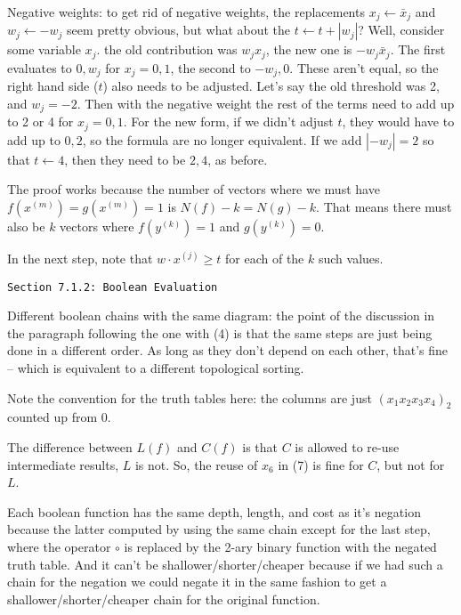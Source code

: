 \vskip0.1in 

\noindent [p75] Negative weights: to get rid of negative weights,
the replacements $x_j \gets \bar x_j$ and $w_j \gets -w_j$ seem
pretty obvious, but what about the $t \gets t + \left|w_j\right|$?
Well, consider some variable $x_j$.  the old contribution was
$w_j x_j$, the new one is $-w_j \bar x_j$.  The first evaluates to
$0, w_j$ for $x_j = 0, 1$, the second to $-w_j, 0$.  These aren't
equal, so the right hand side ($t$) also needs to be adjusted.
Let's say the old threshold was 2, and $w_j = -2$.  Then with
the negative weight the rest of the terms need to add up to 2 or 4
for $x_j = 0, 1$.  For the new form, if we didn't adjust $t$, they
would have to add up to $0, 2$, so the formula are no longer
equivalent.  If we add $\left|-w_j\right| = 2$ so that $t \gets 4$,
then they need to be $2, 4$, as before.

\vskip 0.05in  \hfil\break
The proof works because the number
of vectors where we must have $f\left(x^{\left(m\right)}\right) = 
g\left(x^{\left(m\right)}\right) = 1$ is $N\left(f\right) - k = N\left(g\right) - k$.
That means there must also be $k$ vectors where $f\left(y^{\left(k\right)}\right) = 1$
and $g\left(y^{\left(k\right)}\right) = 0$.

In the next step, note that $w \cdot x^{\left(j\right)} \geq t$ for each of the $k$
such values. 

\vfil\break

\vskip 0.3in
\centerline{\tt Section 7.1.2: Boolean Evaluation}
\vskip0.2in

\noindent [p 97] Different boolean chains with the same diagram: the point
of the discussion in the paragraph following the one with (4) is that the same
steps are just being done in a different order.  As long as they don't depend
on each other, that's fine -- which is equivalent to a different topological sorting.

\vskip 0.05in \noindent [p 98] Note the convention for the truth tables here:
the columns are just $\left(x_1 x_2 x_3 x_4\right)_2$ counted up from 0.

\vskip 0.05in \noindent [p 99] The difference between $L\left(f\right)$
and $C\left(f\right)$ is that $C$ is allowed to re-use intermediate results,
$L$ is not.  So, the reuse of $x_6$ in (7) is fine for $C$, but not for $L$.

\vskip 0.1in 

\noindent [p 99] Each boolean function has the same depth, length,
and cost as it's negation because the latter computed by using the same
chain except for the last step, where the operator $\circ$ is replaced
by the 2-ary binary function with the negated truth table.  And it can't
be shallower/shorter/cheaper because if we had such a chain for the
negation we could negate it in the same fashion to get a shallower/shorter/cheaper
chain for the original function.

